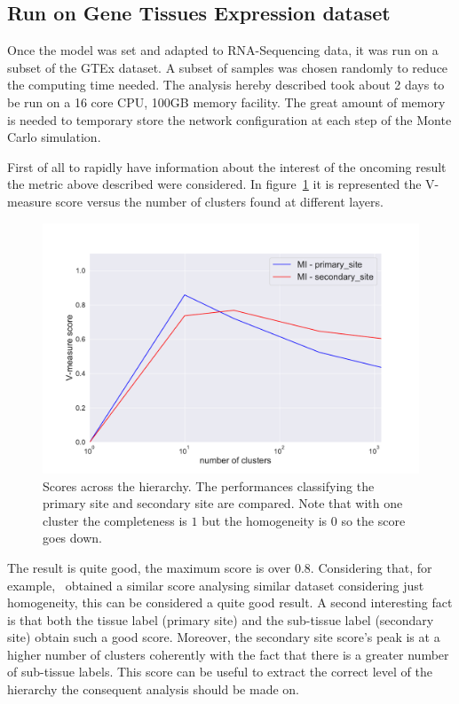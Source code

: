 \subsection{Run on Gene Tissues Expression dataset}
Once the model was set and adapted to RNA-Sequencing data, it was run on a subset of the GTEx dataset. A subset of samples was chosen randomly to reduce the computing time needed. The analysis hereby described took about 2 days to be run on a 16 core CPU, 100GB memory facility. The great amount of memory is needed to temporary store the network configuration at each step of the Monte Carlo simulation.

First of all to rapidly have information about the interest of the oncoming result the metric above described were considered. In figure~\ref{fig:topic/gtex/oversigma_10tissue/metric_scores} it is represented the V-measure score versus the number of clusters found at different layers.
\begin{figure}[htb!]
    \centering
    \includegraphics[width=0.9\linewidth]{pictures/topic/gtex/oversigma_10tissue/metric_scores.pdf}
    \caption{Scores across the hierarchy. The performances classifying the primary site and secondary site are compared. Note that with one cluster the completeness is $1$ but the homogeneity is $0$ so the score goes down.}
    \label{fig:topic/gtex/oversigma_10tissue/metric_scores}
\end{figure}
The result is quite good, the maximum score is over $0.8$. Considering that, for example,~\cite{Farver2018} obtained a similar score analysing similar dataset considering just homogeneity, this can be considered a quite good result. A second interesting fact is that both the tissue label (primary site) and the sub-tissue label (secondary site) obtain such a good score. Moreover, the secondary site score's peak is at a higher number of clusters coherently with the fact that there is a greater number of sub-tissue labels. This score can be useful to extract the correct level of the hierarchy the consequent analysis should be made on.

